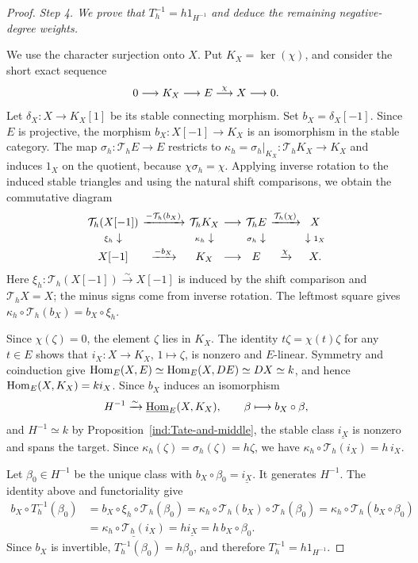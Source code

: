 \documentclass[11pt]{article}
\begin{document}
\begin{proof}
\smallskip
\noindent\emph{Step 4. We prove that $T_h^{-1}=h1_{H^{-1}}$ and deduce the remaining negative-degree weights.}
\par\nobreak\smallskip\nobreak
\noindent
We use the character surjection onto $X$. Put $K_X=\ker(\chi)$, and consider
the short exact sequence
\[
 0\longrightarrow K_X\longrightarrow E\stackrel{\chi}{\longrightarrow}X
 \longrightarrow0.
\]
Let $\delta_X:X\to K_X[1]$ be its stable connecting morphism.
Set $b_X=\delta_X[-1]$. Since $E$ is projective, the morphism $b_X:X[-1]\to K_X$
is an isomorphism in the stable category.
The map $\sigma_h:\mathcal T_hE\to E$ restricts to
$\kappa_h=\sigma_h|_{K_X}:\mathcal T_hK_X\to K_X$ and induces
$1_X$ on the quotient, because $\chi\sigma_h=\chi$.
Applying inverse rotation to the induced stable triangles and using
the natural shift comparisons, we obtain the commutative diagram
\[
 \begingroup\setlength{\arraycolsep}{2pt}
 \begin{array}{ccccccc}
 \mathcal T_h(X[-1])
 &\xrightarrow{-\mathcal T_h(b_X)}&\mathcal T_hK_X
 &\longrightarrow&\mathcal T_hE
 &\xrightarrow{\mathcal T_h(\chi)}&X\\[2pt]
 {\scriptstyle\xi_h}\downarrow
 &&{\scriptstyle\kappa_h}\downarrow
 &&{\scriptstyle\sigma_h}\downarrow
 &&\downarrow{\scriptstyle1_X}\\[2pt]
 X[-1]&\xrightarrow{-b_X}&K_X
 &\longrightarrow&E&\xrightarrow{\chi}&X.
 \end{array}
 \endgroup
\]
Here $\xi_h:\mathcal T_h(X[-1])\xrightarrow{\sim}X[-1]$
is induced by the shift comparison and $\mathcal T_hX=X$;
the minus signs come from inverse rotation.
The leftmost square gives
$\kappa_h\circ\mathcal T_h(b_X)=b_X\circ\xi_h$.

Since $\chi(\zeta)=0$, the element $\zeta$ lies in $K_X$.
The identity $t\zeta=\chi(t)\zeta$ for any $t\in E$ shows that
$i_X:X\to K_X$, $1\mapsto\zeta$, is nonzero and $E$-linear.
Symmetry and coinduction give
${\rm Hom}_E(X,E)\simeq{\rm Hom}_E(X,DE)\simeq DX\simeq k$,
and hence ${\rm Hom}_E(X,K_X)=ki_X$.
Since $b_X$ induces an isomorphism
\[
 H^{-1}\xrightarrow{\sim}\underline{{\rm Hom}}_E(X,K_X),
 \qquad\beta\longmapsto b_X\circ\beta,
\]
and $H^{-1}\simeq k$ by Proposition~\ref{ind:Tate-and-middle},
the stable class $\underline{i_X}$ is nonzero and spans the target.
Since $\kappa_h(\zeta)=\sigma_h(\zeta)=h\zeta$, we have
$\kappa_h\circ\mathcal T_h(i_X)=h\,i_X$.

Let $\beta_0\in H^{-1}$ be the unique class with
$b_X\circ\beta_0=\underline{i_X}$. It generates $H^{-1}$.
The identity above and functoriality give
\[
 \begin{aligned}
 b_X\circ T_h^{-1}(\beta_0)
 &=b_X\circ\xi_h\circ\mathcal T_h(\beta_0)
  =\kappa_h\circ\mathcal T_h(b_X)\circ\mathcal T_h(\beta_0)=\kappa_h\circ\mathcal T_h(b_X\circ\beta_0)\\
 &=\underline{\kappa_h\circ\mathcal T_h(i_X)}=h\underline{i_X}=h\,b_X\circ\beta_0.
 \end{aligned}
\]
Since $b_X$ is invertible, $T_h^{-1}(\beta_0)=h\beta_0$, and
therefore $T_h^{-1}=h1_{H^{-1}}$.


\end{proof}
\end{document}
